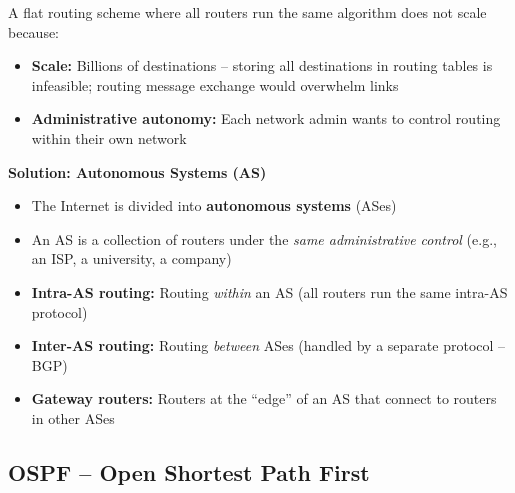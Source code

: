 \begin{keybox}
A flat routing scheme where all routers run the same algorithm does not scale because:
\begin{itemize}[noitemsep]
    \item \textbf{Scale:} Billions of destinations -- storing all destinations in routing tables is infeasible; routing message exchange would overwhelm links
    \item \textbf{Administrative autonomy:} Each network admin wants to control routing within their own network
\end{itemize}

\textbf{Solution: Autonomous Systems (AS)}
\begin{itemize}[noitemsep]
    \item The Internet is divided into \textbf{autonomous systems} (ASes)
    \item An AS is a collection of routers under the \emph{same administrative control} (e.g., an ISP, a university, a company)
    \item \textbf{Intra-AS routing:} Routing \emph{within} an AS (all routers run the same intra-AS protocol)
    \item \textbf{Inter-AS routing:} Routing \emph{between} ASes (handled by a separate protocol -- BGP)
    \item \textbf{Gateway routers:} Routers at the ``edge'' of an AS that connect to routers in other ASes
\end{itemize}
\end{keybox}

\subsection{OSPF -- Open Shortest Path First}

